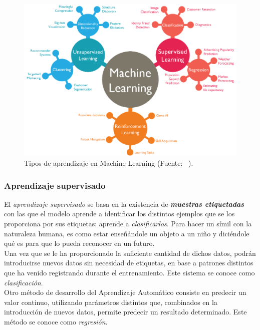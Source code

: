 \begin{figure}[h]
    \centering
    \includegraphics[scale=0.5]{cap2_contextualizacion/images/ml_learning.png}
    \caption{Tipos de aprendizaje en Machine Learning (Fuente: ~\cite{chugh2008mltypes}).}
    \label{fig:ml_tipos_aprendizaje}
\end{figure}


\subsubsection{Aprendizaje supervisado}

El \textit{aprendizaje supervisado} se basa en la existencia de \textbf{\textit{muestras etiquetadas}} con las que el modelo aprende a identificar los distintos ejemplos que se los proporciona por sus etiquetas: aprende a \textit{clasificarlos}. Para hacer un símil con la naturaleza humana, es como estar enseñándole un objeto a un niño  y diciéndole qué es para que lo pueda reconocer en un futuro. \\

Una vez que se le ha proporcionado la suficiente cantidad de dichos datos, podrán introducirse nuevos datos sin necesidad de etiquetas, en base a patrones distintos que ha venido registrando durante el entrenamiento. Este sistema se conoce como \textit{clasificación}. \\

Otro método de desarrollo del Aprendizaje Automático consiste en predecir un valor continuo, utilizando parámetros distintos que, combinados en la introducción de nuevos datos, permite predecir un resultado determinado. Este método se conoce como \textit{regresión}. \\

